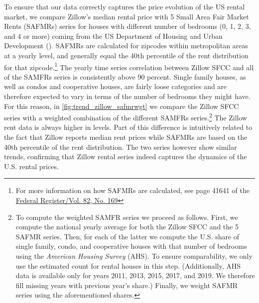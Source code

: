 To ensure that our data correctly captures the price evolution of the US rental market, we compare 
Zillow's median rental price with 5 Small Area Fair Market Rents (SAFMRs) series for houses with 
different number of bedrooms (0, 1, 2, 3, and 4 or more) coming from the US Department of Housing and 
Urban Development (\citeyear{hud}). SAFMRs are calculated for zipcodes within metropolitan areas at a 
yearly level, and generally equal the 40th percentile of the rent distribution for that 
zipcode.\footnote{For more information on how SAFMRs are calculated, see page 41641 of the 
	\href{https://www.huduser.gov/portal/datasets/fmr/fmr2018/FY2018-FMR-Preamble.pdf}
	{Federal Register/Vol. 82, No. 169}} 
The yearly time series correlation between Zillow SFCC and all of the SAMFRs series is consistently 
above 90 percent. Single family houses, as well as condos and cooperative houses, are fairly loose 
categories and are therefore expected to vary in terms of the number of bedrooms they might have. For 
this reason, in \autoref{fig:trend_zillow_safmrwgt} we compare the Zillow SFCC series with a weighted 
combination of the different SAMFRs series.\footnote{To compute the weighted SAMFR series we proceed 
	as follows. First, we compute the national yearly average for both the Zillow SFCC and the 5 
	SAFMR series. Then, for each of the latter we compute the U.S. share of single family, condo, 
	and cooperative houses with that number of bedrooms using the \textit{American Housing Survey} 
	(AHS). To ensure comparability, we only use the estimated count for rental houses in this step. 
	(Additionally, AHS data is available only for years 2011, 2013, 2015, 2017, and 2019. We therefore 
	fill missing years with previous year's share.) Finally, we weight SAFMR series using the 
	aforementioned shares.} 
The Zillow rent data is always higher in levels. Part of this difference is intuitively related to the 
fact that Zillow reports median rent prices while SAFMRs are based on the 40th percentile of the rent 
distribution. The two series however show similar trends, confirming that Zillow rental series indeed 
captures the dynamics of the U.S. rental prices.


